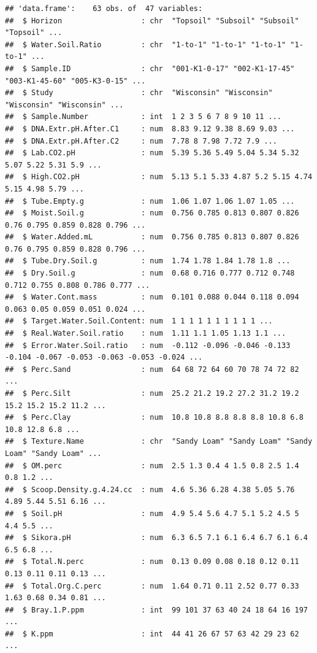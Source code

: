 \documentclass[]{article}
\begin{document}
\begin{verbatim}
## 'data.frame':    63 obs. of  47 variables:
##  $ Horizon                  : chr  "Topsoil" "Subsoil" "Subsoil" "Topsoil" ...
##  $ Water.Soil.Ratio         : chr  "1-to-1" "1-to-1" "1-to-1" "1-to-1" ...
##  $ Sample.ID                : chr  "001-K1-0-17" "002-K1-17-45" "003-K1-45-60" "005-K3-0-15" ...
##  $ Study                    : chr  "Wisconsin" "Wisconsin" "Wisconsin" "Wisconsin" ...
##  $ Sample.Number            : int  1 2 3 5 6 7 8 9 10 11 ...
##  $ DNA.Extr.pH.After.C1     : num  8.83 9.12 9.38 8.69 9.03 ...
##  $ DNA.Extr.pH.After.C2     : num  7.78 8 7.98 7.72 7.9 ...
##  $ Lab.CO2.pH               : num  5.39 5.36 5.49 5.04 5.34 5.32 5.07 5.22 5.31 5.9 ...
##  $ High.CO2.pH              : num  5.13 5.1 5.33 4.87 5.2 5.15 4.74 5.15 4.98 5.79 ...
##  $ Tube.Empty.g             : num  1.06 1.07 1.06 1.07 1.05 ...
##  $ Moist.Soil.g             : num  0.756 0.785 0.813 0.807 0.826 0.76 0.795 0.859 0.828 0.796 ...
##  $ Water.Added.mL           : num  0.756 0.785 0.813 0.807 0.826 0.76 0.795 0.859 0.828 0.796 ...
##  $ Tube.Dry.Soil.g          : num  1.74 1.78 1.84 1.78 1.8 ...
##  $ Dry.Soil.g               : num  0.68 0.716 0.777 0.712 0.748 0.712 0.755 0.808 0.786 0.777 ...
##  $ Water.Cont.mass          : num  0.101 0.088 0.044 0.118 0.094 0.063 0.05 0.059 0.051 0.024 ...
##  $ Target.Water.Soil.Content: num  1 1 1 1 1 1 1 1 1 1 ...
##  $ Real.Water.Soil.ratio    : num  1.11 1.1 1.05 1.13 1.1 ...
##  $ Error.Water.Soil.ratio   : num  -0.112 -0.096 -0.046 -0.133 -0.104 -0.067 -0.053 -0.063 -0.053 -0.024 ...
##  $ Perc.Sand                : num  64 68 72 64 60 70 78 74 72 82 ...
##  $ Perc.Silt                : num  25.2 21.2 19.2 27.2 31.2 19.2 15.2 15.2 15.2 11.2 ...
##  $ Perc.Clay                : num  10.8 10.8 8.8 8.8 8.8 10.8 6.8 10.8 12.8 6.8 ...
##  $ Texture.Name             : chr  "Sandy Loam" "Sandy Loam" "Sandy Loam" "Sandy Loam" ...
##  $ OM.perc                  : num  2.5 1.3 0.4 4 1.5 0.8 2.5 1.4 0.8 1.2 ...
##  $ Scoop.Density.g.4.24.cc  : num  4.6 5.36 6.28 4.38 5.05 5.76 4.89 5.44 5.51 6.16 ...
##  $ Soil.pH                  : num  4.9 5.4 5.6 4.7 5.1 5.2 4.5 5 4.4 5.5 ...
##  $ Sikora.pH                : num  6.3 6.5 7.1 6.1 6.4 6.7 6.1 6.4 6.5 6.8 ...
##  $ Total.N.perc             : num  0.13 0.09 0.08 0.18 0.12 0.11 0.13 0.11 0.11 0.13 ...
##  $ Total.Org.C.perc         : num  1.64 0.71 0.11 2.52 0.77 0.33 1.63 0.68 0.34 0.81 ...
##  $ Bray.1.P.ppm             : int  99 101 37 63 40 24 18 64 16 197 ...
##  $ K.ppm                    : int  44 41 26 67 57 63 42 29 23 62 ...

\end{verbatim}
\end{document}
